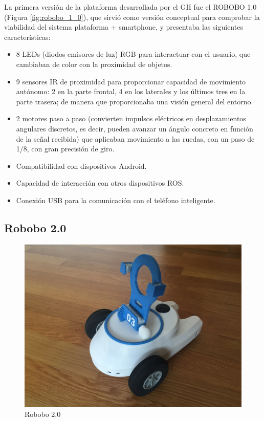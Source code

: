 La primera versión de la plataforma  desarrollada por el GII fue el ROBOBO 1.0 (Figura \ref{fig:robobo_1_0}), que sirvió como versión conceptual para comprobar la viabilidad del sistema plataforma + smartphone, y presentaba las siguientes características:

\begin{itemize}

	\item 8 LEDs (diodos emisores de luz) RGB para interactuar con el usuario, que cambiaban de color con la proximidad de objetos.
	\item 9 sensores IR de proximidad para proporcionar capacidad de movimiento autónomo: 2 en la parte frontal, 4 en los laterales y los últimos tres en la parte trasera; de manera que proporcionaba una visión general del entorno.
	\item 2 motores paso a paso (convierten impulsos eléctricos en desplazamientos angulares discretos, es decir, pueden avanzar un ángulo concreto en función de la señal recibida) que aplicaban movimiento a las ruedas, con un paso de 1/8, con gran precisión de giro.
	\item Compatibilidad con dispositivos Android.
	\item Capacidad de interacción con otros dispositivos ROS.
	\item Conexión USB para la comunicación con el teléfono inteligente.

\end{itemize}

\subsection{Robobo 2.0}
\begin{figure}
	\centering
	\includegraphics[width=0.8\linewidth]{imagenes/robobo_rob.JPG}
	\caption{Robobo 2.0}
	\label{fig:robobo_2_0}
\end{figure} 

